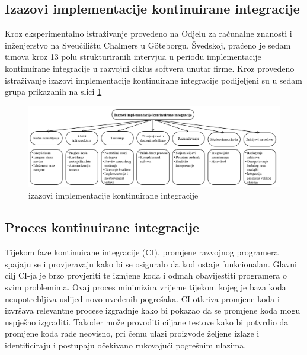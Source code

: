 \documentclass[a4paper,12pt,oneside]{article}
\begin{document}
\subsection{Izazovi implementacije kontinuirane integracije}
Kroz eksperimentalno istraživanje provedeno na Odjelu za računalne znanosti i inženjerstvo na Sveučilištu Chalmers u Göteborgu, Švedskoj, praćeno je sedam timova kroz 13 polu strukturiranih intervjua u periodu implementacije kontinuirane integracije u razvojni ciklus softvera unutar firme. Kroz provedeno istraživanje izazovi implementacije kontinuirane integracije podijeljeni su u sedam grupa prikazanih na slici \ref{f:izazovi implementacije kontinuirane integracije}


\begin{figure}[ht!] %
	\centering %
	\includegraphics[scale=0.44]{./Slike/izazovi implementacije kontinuirane integracije.png} %
	\caption{izazovi implementacije kontinuirane integracije \cite{challenges} \label{f:izazovi implementacije kontinuirane integracije}} %
\end{figure}

\subsection{Proces kontinuirane integracije}
Tijekom faze kontinuirane integracije (CI), promjene razvojnog programera spajaju se i provjeravaju kako bi se osiguralo da kod ostaje funkcionalan. Glavni cilj CI-ja je brzo provjeriti te izmjene koda i odmah obavijestiti programera o svim problemima. Ovaj proces minimizira vrijeme tijekom kojeg je baza koda neupotrebljiva uslijed novo uvedenih pogrešaka. CI otkriva promjene koda i izvršava relevantne procese izgradnje kako bi pokazao da se promjene koda mogu uspješno izgraditi. Također može provoditi ciljane testove kako bi potvrdio da promjene koda rade neovisno, pri čemu ulazi proizvode željene izlaze i identificiraju i postupaju očekivano rukovajući pogrešnim ulazima.
\end{document}
